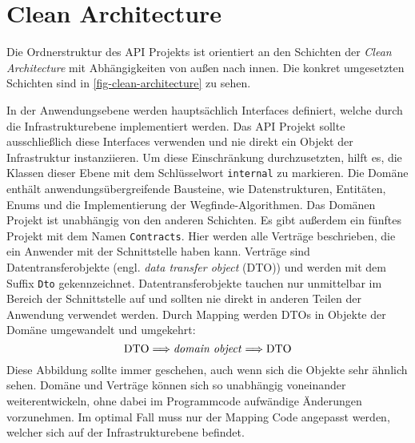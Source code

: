 \part{Clean Architecture}
Die Ordnerstruktur des API Projekts ist orientiert an den Schichten
der \textit{Clean Architecture}
mit Abhän\-gigkeiten von außen nach innen. Die konkret umgesetzten Schichten
sind in \autoref{fig-clean-architecture} zu sehen.



\noindent
In der Anwendungsebene werden hauptsächlich Interfaces definiert, welche
durch die Infrastrukturebene implementiert werden. Das API Projekt
sollte ausschließlich diese Interfaces verwenden und nie direkt
ein Objekt der Infrastruktur instanziieren.
Um diese Einschränkung durchzusetzten, hilft es,
die Klassen dieser Ebene mit dem Schlüsselwort \texttt{internal} zu markieren.
Die Domäne enthält anwendungsübergreifende Bausteine, wie
Datenstrukturen, Entitäten, Enums und die Implementierung der Wegfinde-Algorith\-men.
Das Domänen Projekt ist unabhängig von den anderen Schichten.
Es gibt außerdem ein fünftes Projekt mit dem Namen \texttt{Contracts}. Hier
werden alle Verträge beschrieben, die ein Anwender mit der Schnittstelle
haben kann. Verträge sind Datentransferobjekte (engl. \textit{data transfer object} (DTO))
und werden mit dem Suffix \texttt{Dto} gekennzeichnet. Datentransferobjekte
tauchen nur unmittelbar im Bereich der Schnittstelle auf und
sollten nie direkt in anderen Teilen der Anwendung verwendet werden.
Durch Mapping werden DTOs in Objekte der Domäne umgewandelt und umgekehrt:
\begin{equation*}
  \text{DTO} \Longrightarrow \text{\textit{domain object}} \Longrightarrow \text{DTO}
\end{equation*}
Diese Abbildung sollte immer geschehen, auch wenn sich die Objekte
sehr ähnlich sehen.
Domäne und Verträge können sich so unabhängig voneinander weiterentwickeln,
ohne dabei im Programmcode aufwändige Änderungen vorzunehmen.
Im optimal Fall muss nur der Mapping Code angepasst werden,
welcher sich auf der Infrastrukturebene befindet.